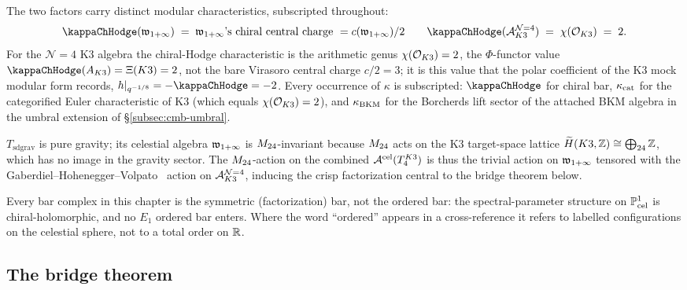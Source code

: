 \begin{remark}
\label{rem:cmb-two-kappa}
The two factors carry distinct modular characteristics, subscripted throughout:
\[
\kapch(\wtc) \;=\; \wtc\text{'s chiral central charge }
 = c(\wtc) / 2 \qquad
\kapch(\cA^{\mathcal{N}{=}4}_{K3}) \;=\; \chi(\cO_{K3}) \;=\; 2.
\]
For the $\mathcal{N}{=}4$ K3 algebra the chiral-Hodge characteristic is
the arithmetic genus $\chi(\mathcal O_{K3}) = 2$, the $\Phi$-functor value
$\kapch(A_{K3}) = \Xi(K3) = 2$, not the bare Virasoro central charge
$c/2 = 3$; it is this value that the polar coefficient of the K3 mock
modular form records, $h|_{q^{-1/8}} = -\kapch = -2$.
Every occurrence of $\kappa$ is subscripted: $\kapch$ for chiral bar,
$\kappa_{\mathrm{cat}}$ for the categorified Euler
characteristic of K3 (which equals $\chi(\mathcal O_{K3}) = 2$), and
$\kappa_{\mathrm{BKM}}$ for the Borcherds lift sector of the attached BKM
algebra in the umbral extension of
\S\ref{subsec:cmb-umbral}.
\end{remark}

\begin{remark}
\label{rem:cmb-gravity-m24-invariant}
$T_{\mathrm{sd grav}}$ is pure gravity; its celestial algebra $\mathfrak w_{1+\infty}$ is
$M_{24}$-invariant because $M_{24}$ acts on the K3 target-space
lattice $\widetilde H(K3, \mathbb Z) \cong \bigoplus_{24} \mathbb Z$, which has no
image in the gravity sector. The $M_{24}$-action on the combined
$\mathcal A^{\mathrm{cel}}(T_4^{K3})$ is thus the trivial action on $\mathfrak w_{1+\infty}$ tensored with
the Gaberdiel--Hohenegger--Volpato~\cite{GaberdielHoheneggerVolpato10,
GaberdielHoheneggerVolpato11} action on $\mathcal A^{\mathcal{N}{=}4}_{K3}$,
inducing the crisp factorization central to the bridge theorem below.
\end{remark}

\begin{remark}
\label{rem:cmb-no-ordering}
Every bar complex in this chapter is the symmetric (factorization) bar,
not the ordered bar: the spectral-parameter structure on $\mathbb P^1_{\mathrm{cel}}$
is chiral-holomorphic, and no $E_1$
ordered bar enters. Where the word ``ordered'' appears in a cross-reference
it refers to labelled configurations on the celestial sphere,
not to a total order on $\mathbb R$.
\end{remark}

\subsection{The bridge theorem}
\label{subsec:cmb-main}

